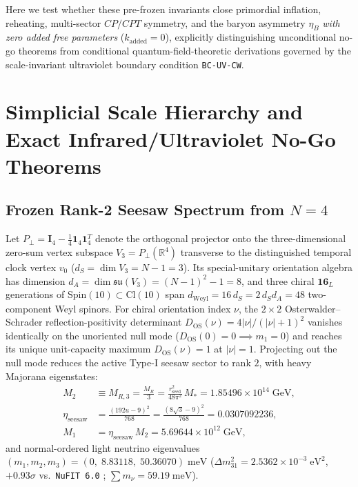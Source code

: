 \documentclass[11pt,a4paper]{article}
\begin{document}
Here we test whether these pre-frozen invariants close primordial inflation, reheating, multi-sector $CP/CPT$ symmetry, and the baryon asymmetry $\eta_B$ \emph{with zero added free parameters} ($k_{\mathrm{added}} = 0$), explicitly distinguishing unconditional no-go theorems from conditional quantum-field-theoretic derivations governed by the scale-invariant ultraviolet boundary condition \texttt{BC-UV-CW}.

\section{Simplicial Scale Hierarchy and Exact Infrared/Ultraviolet No-Go Theorems}
\label{sec:nogo}

\subsection{Frozen Rank-2 Seesaw Spectrum from \texorpdfstring{$N = 4$}{N = 4}}

Let $P_\perp = \mathbf{I}_4 - \frac{1}{4}\mathbf{1}_4\mathbf{1}_4^T$ denote the orthogonal projector onto the three-dimensional zero-sum vertex subspace $V_3 = P_\perp(\mathbb{R}^4)$ transverse to the distinguished temporal clock vertex $v_0$ ($d_S = \dim V_3 = N - 1 = 3$). Its special-unitary orientation algebra has dimension $d_A = \dim\mathfrak{su}(V_3) = (N-1)^2 - 1 = 8$, and three chiral $\mathbf{16}_L$ generations of $\mathrm{Spin}(10) \subset \mathrm{Cl}(10)$ span $d_{\mathrm{Weyl}} = 16\,d_S = 2\,d_S d_A = 48$ two-component Weyl spinors. For chiral orientation index $\nu$, the $2\times 2$ Osterwalder--Schrader reflection-positivity determinant $D_{\mathrm{OS}}(\nu) = 4|\nu|/(|\nu|+1)^2$ vanishes identically on the unoriented null mode ($D_{\mathrm{OS}}(0) = 0 \implies m_1 = 0$) and reaches its unique unit-capacity maximum $D_{\mathrm{OS}}(\nu) = 1$ at $|\nu| = 1$. Projecting out the null mode reduces the active Type-I seesaw sector to rank $2$, with heavy Majorana eigenstates:
\begin{align}
M_2 &\equiv M_{R,3} = \frac{M_R}{3} = \frac{r_{\mathrm{seed}}^2}{48\pi^2}\,M_* = 1.85496\times 10^{14}\;\mathrm{GeV}, \label{eq:M2}\\
\eta_{\mathrm{seesaw}} &= \frac{(192u - 9)^2}{768} = \frac{(8\sqrt{3} - 9)^2}{768} = 0.0307092236, \label{eq:eta-seesaw}\\
M_1 &= \eta_{\mathrm{seesaw}}\,M_2 = 5.69644\times 10^{12}\;\mathrm{GeV}, \label{eq:M1}
\end{align}
and normal-ordered light neutrino eigenvalues $(m_1, m_2, m_3) = (0,\;8.83118,\;50.36070)\;\mathrm{meV}$ ($\Delta m_{31}^2 = 2.5362\times 10^{-3}\;\mathrm{eV}^2$, $+0.93\sigma$ vs.\ \texttt{NuFIT 6.0} \cite{Esteban2024NuFIT6}; $\sum m_\nu = 59.19\;\mathrm{meV}$).
\end{document}
